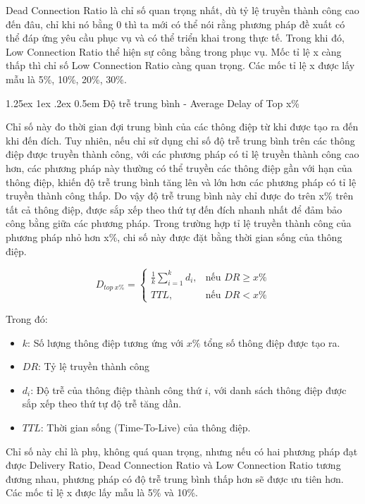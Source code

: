 \documentclass[a4paper]{article}
\makeatletter
\renewcommand{\paragraph}{%
  \@startsection{paragraph}{4}{\z@}%
  {1.25ex \@plus 1ex \@minus .2ex}%
  {0.5em}%
  {\normalfont\normalsize\bfseries}%
}
\makeatother
\begin{document}
Dead Connection Ratio là chỉ số quan trọng nhất, dù tỷ lệ truyền thành công cao đến đâu, chỉ khi nó bằng 0 thì ta mới có thể nói rằng phương pháp đề xuất có thể đáp ứng yêu cầu phục vụ và có thể triển khai trong thực tế. Trong khi đó, Low Connection Ratio thể hiện sự công bằng trong phục vụ. Mốc tỉ lệ x càng thấp thì chỉ số Low Connection Ratio càng quan trọng. Các mốc tỉ lệ x được lấy mẫu là 5\%, 10\%, 20\%, 30\%.

\paragraph{Độ trễ trung bình - Average Delay of Top x\%}

Chỉ số này đo thời gian đợi trung bình của các thông điệp từ khi được tạo ra đến khi đến đích.
Tuy nhiên, nếu chỉ sử dụng chỉ số độ trễ trung bình trên các thông điệp được truyền thành công, với các phương pháp có tỉ lệ truyền thành công cao hơn, các phương pháp này thường có thể truyền các thông điệp gần với hạn của thông điệp, khiến độ trễ trung bình tăng lên và lớn hơn các phương pháp có tỉ lệ truyền thành công thấp. Do vậy độ trễ trung bình này chỉ được đo trên x\% trên tất cả thông điệp, được sắp xếp theo thứ tự đến đích nhanh nhất để đảm bảo công bằng giữa các phương pháp.
Trong trường hợp tỉ lệ truyền thành công của phương pháp nhỏ hơn x\%, chi số này được đặt bằng thời gian sống của thông điệp. 

\begin{equation}
D_{top\ x\%} = 
\begin{cases} 
\frac{1}{k} \sum_{i=1}^{k} d_i, & \text{nếu } DR \ge x\% \\ 
TTL, & \text{nếu } DR < x\%
\end{cases}
\end{equation}

Trong đó:
\begin{itemize}
    \item $k$: Số lượng thông điệp tương ứng với $x\%$ tổng số thông điệp được tạo ra.
    \item $DR$: Tỷ lệ truyền thành công
    \item $d_i$: Độ trễ của thông điệp thành công thứ $i$, với danh sách thông điệp được sắp xếp theo thứ tự độ trễ tăng dần.
    \item $TTL$: Thời gian sống (Time-To-Live) của thông điệp.
\end{itemize}

Chỉ số này chỉ là phụ, không quá quan trọng, nhưng nếu có hai phương pháp đạt được Delivery Ratio, Dead Connection Ratio và Low Connection Ratio tương đương nhau, phương pháp có độ trễ trung bình thấp hơn sẽ được ưu tiên hơn. Các mốc tỉ lệ x được lấy mẫu là 5\% và 10\%.
\end{document}
